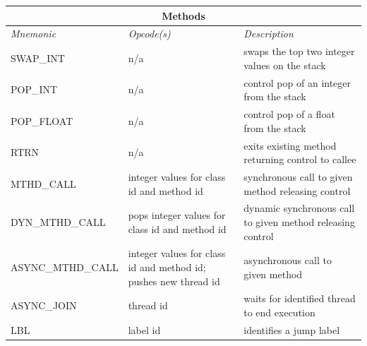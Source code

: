 \documentclass[11pt]{article}
\begin{document}
\begin{center}
  \vspace{\baselineskip}
  \begin{tabular}{| l | p{4 cm} | p{6 cm} |}
    \hline
    \multicolumn{3}{|c|}{\textbf{Methods}} \\
    \hline
    \emph{Mnemonic}  &  \emph{Opcode(s)}  &  \emph{Description} \\ \hline \hline
    SWAP\_INT & n/a & swaps the top two integer values on the stack \\ \hline
    POP\_INT & n/a & control pop of an integer from the stack \\ \hline
    POP\_FLOAT & n/a & control pop of a float from the stack \\ \hline
    RTRN & n/a & exits existing method returning control to callee \\ \hline
    MTHD\_CALL & integer values for class id and method id & synchronous call to given method releasing control \\ \hline
    DYN\_MTHD\_CALL & pops integer values for class id and method id & dynamic synchronous call to given method releasing control \\ \hline
    ASYNC\_MTHD\_CALL & integer values for class id and method id; pushes new thread id & asynchronous call to given method \\ \hline
    ASYNC\_JOIN & thread id & waits for identified thread to end execution \\ \hline
    LBL & label id & identifies a jump label \\ \hline
\end{tabular}


\end{center}
\end{document}
